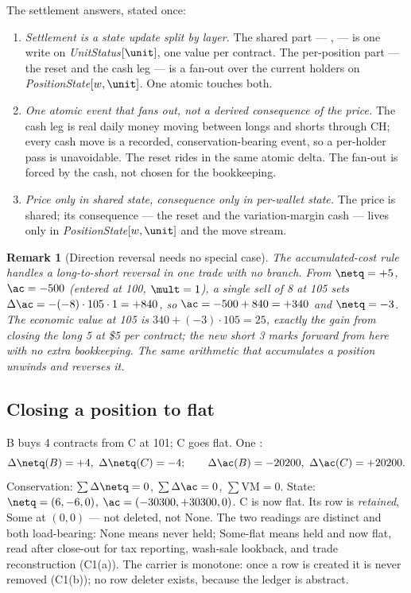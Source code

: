\documentclass[11pt,a4paper]{article}
\newtheorem{remark}[definition]{Remark}
\begin{document}
\noindent The settlement answers, stated once:
\begin{enumerate}
\item \emph{Settlement is a state update split by layer.} The shared part ---
,  --- is one write on
\emph{UnitStatus}$[\unit]$, one value per contract. The per-position part --- the \ac{} reset and the
cash leg --- is a fan-out over the current holders on \emph{PositionState}$[w,\unit]$. One atomic
 touches both.
\item \emph{One atomic event that fans out, not a derived consequence of the price.} The cash leg is
real daily money moving between longs and shorts through CH; every cash move is a recorded,
conservation-bearing event, so a per-holder pass is unavoidable. The \ac{} reset rides in the same
atomic delta. The fan-out is forced by the cash, not chosen for the bookkeeping.
\item \emph{Price only in shared state, consequence only in per-wallet state.} The price is shared;
its consequence --- the \ac{} reset and the variation-margin cash --- lives only in
\emph{PositionState}$[w,\unit]$ and the move stream.
\end{enumerate}

\begin{remark}[Direction reversal needs no special case]
The accumulated-cost rule handles a long-to-short reversal in one trade with no branch. From
$\netq=+5$, $\ac=-500$ (entered at 100, $\mult=1$), a single sell of 8 at 105 sets
$\Delta\ac=-(-8)\cdot 105\cdot 1=+840$, so $\ac=-500+840=+340$ and $\netq=-3$. The economic value at
105 is $340+(-3)\cdot 105 = 25$, exactly the gain from closing the long 5 at \$5 per contract; the new
short 3 marks forward from here with no extra bookkeeping. The same arithmetic that accumulates a
position unwinds and reverses it.
\end{remark}

\subsection{Closing a position to flat}
\label{sec:close}

B buys 4 contracts from C at 101; C goes flat. One :
\[
\Delta\netq(B)=+4,\ \Delta\netq(C)=-4;\qquad \Delta\ac(B)=-20200,\ \Delta\ac(C)=+20200.
\]
Conservation: $\sum\Delta\netq=0$, $\sum\Delta\ac=0$, $\sum\mathrm{VM}=0$. State: $\netq=(6,-6,0)$,
$\ac=(-30300,+30300,0)$. C is now flat. Its row is \emph{retained}, $\mathrm{Some}$ at $(0,0)$ --- not
deleted, not $\mathrm{None}$. The two readings are distinct and both load-bearing: $\mathrm{None}$
means never held; $\mathrm{Some}$-flat means held and now flat, read after close-out for tax
reporting, wash-sale lookback, and trade reconstruction (C1(a)). The carrier is monotone: once a row
is created it is never removed (C1(b)); no row deleter exists, because the ledger is abstract.
\end{document}
